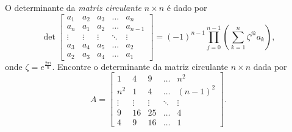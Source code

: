 \documentclass[11pt,a4paper]{article}
\begin{document}
 O determinante da \emph{matriz circulante} $n \times n$ é dado por
\[
\det \begin{bmatrix} a_1 & a_2 & a_3 & \ldots & a_n \\
a_n & a_1 & a_2 & \ldots & a_{n-1} \\
\vdots & \vdots & \vdots & \ddots & \vdots \\
a_3 & a_4 & a_5 & \ldots & a_2 \\
a_2 & a_3 & a_4 & \ldots & a_1
\end{bmatrix} = (-1)^{n-1} \prod\limits_{j = 0}^{n-1} \left( \sum\limits_{k = 1}^n \zeta^{jk} a_k \right),
\]
onde $\zeta = e^{\frac{2 \pi i}{n}}.$ Encontre o determinante da matriz circulante $n \times n$ dada por
\[
A = \begin{bmatrix} 1 & 4 & 9 & \ldots & n^2  \\
n^2 & 1 & 4 & \ldots & (n-1)^2 \\
\vdots & \vdots & \vdots & \ddots & \vdots \\
9 & 16 & 25 & \ldots & 4 \\
4& 9 & 16 & \ldots & 1
\end{bmatrix}.
\]



\solucao{}
\end{document}

